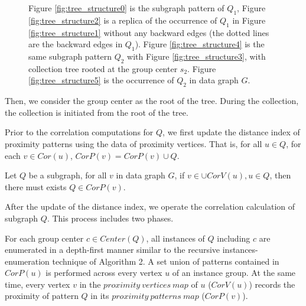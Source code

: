 \begin{figure}[t!]
\begin{subfigure}[b]{0.5\textwidth}
	\end{subfigure}
	\vspace{-2mm}
	\caption{\scriptsize Figure \ref{fig:tree_structure0} is the subgraph pattern of $Q_1$, Figure \ref{fig:tree_structure2} is a replica of the occurrence of $Q_1$ in Figure \ref{fig:tree_structure1} without any backward edges (the dotted lines are the backward edges in $Q_1$). Figure \ref{fig:tree_structure4} is the same subgraph pattern $Q_2$ with Figure \ref{fig:tree_structure3}, with collection tree rooted at the group center $s_2$. Figure \ref{fig:tree_structure5} is the occurrence of $Q_2$ in data graph $G$.}
	\label{fig:replica}
\end{figure}

%
Then, we consider the group center as the root of the tree. During the collection, the collection is initiated from the root of the tree.


\par Prior to the correlation computations for $Q$, we first update the distance index of proximity patterns using the data of proximity vertices. That is, for all $u\in Q$, for each $v\in Cor(u)$, $CorP(v)=CorP(v)\cup Q$.
\begin{lma}
	\label{lemma:distance bidirection relation between vertices and patterns}
	Let $Q$ be a subgraph, for all $v$ in data graph $G$, if $v\in \cup CorV(u),u\in Q$, then there must exists $Q\in CorP(v)$.
\end{lma}
\par After the update of the distance index, we operate the correlation calculation of subgraph $Q$. This process includes two phases.

 For each group center $c\in Center(Q)$, all instances of $Q$ including $c$ are enumerated in a depth-first manner similar to the recursive instances-enumeration technique of Algorithm 2. A set union of patterns contained in $CorP(u)$ is performed across every vertex $u$ of an instance group. At the same time, every vertex $v$ in the $proximity\ vertices\ map$ of $u$ ($CorV(u)$) records the proximity of pattern $Q$ in its $proximity\ patterns\ map$ ($CorP(v)$).

